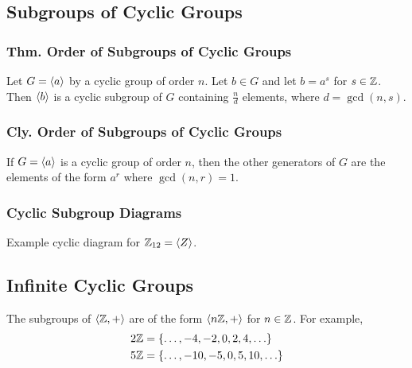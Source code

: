 \subsection{Subgroups of Cyclic Groups}

\subsubsection{Thm. Order of Subgroups of Cyclic Groups}
Let $G = \langle a \rangle$ by a cyclic group of order $n$. Let $b \in G$ and let $b = a^s$ for $s \in \mathbb{Z}$. Then $\langle b \rangle$ is a cyclic subgroup of $G$ containing $\frac{n}{d}$ elements, where $d = \gcd(n,s)$.

\subsubsection{Cly. Order of Subgroups of Cyclic Groups}
If $G = \langle a \rangle$ is a cyclic group of order $n$, then the other generators of $G$ are the elements of the form $a^r$ where $\gcd(n,r) = 1$.

\subsubsection*{Cyclic Subgroup Diagrams}
Example cyclic diagram for $\mathbb{Z}_{12} = \langle Z \rangle$.
\begin{center}
\end{center}

\subsection{Infinite Cyclic Groups}
The subgroups of $\langle \mathbb{Z},+ \rangle$ are of the form $\langle n\mathbb{Z}, + \rangle$ for $n \in \mathbb{Z}$. For example,
\begin{align*}
    2\mathbb{Z} & = \{\ldots, -4,-2,0,2,4,\ldots\} \\
    5\mathbb{Z} & = \{\ldots, -10,-5,0,5,10,\ldots\}
\end{align*}